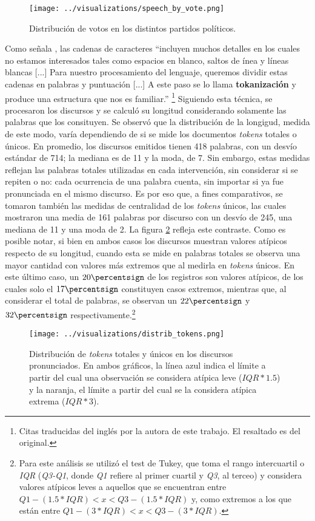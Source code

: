 \begin{figure}[h!]
    \centering
    \texttt{[image: ../visualizations/speech\_by\_vote.png]}
    \caption{Distribuci\'on de votos en los distintos partidos pol\'iticos.}%
    \label{fig-distrib-speech}
\end{figure}

Como señala \cite{bird2009natural}, las cadenas de caracteres ``incluyen muchos detalles
en los cuales no estamos interesados tales como espacios en blanco, saltos de \'inea
y l\'ineas blancas [...] Para nuestro procesamiento del lenguaje, queremos dividir
estas cadenas en palabras y puntuaci\'on  [...] A este paso se lo llama
\textbf{tokanizaci\'on} y produce una estructura que nos es familiar.''
\footnote{Citas traducidas del ingl\'es por la autora de este trabajo.
El resaltado es del original.}
Siguiendo esta t\'ecnica, se procesaron los discursos y se calcul\'o su
longitud considerando solamente las palabras que los consituyen.
Se observ\'o que la distribuci\'on de la longigud, medida de este modo, var\'ia
dependiendo de si se mide los documentos \textit{tokens} totales o \'unicos.
En promedio, los discursos emitidos tienen 418 palabras, con un desv\'io
est\'andar de 714; la mediana es de 11 y la moda, de 7. Sin embargo, estas medidas
reflejan las palabras totales utilizadas en cada intervenci\'on, sin considerar si se repiten
o no: cada ocurrencia de una palabra cuenta, sin importar si ya fue pronunciada en el mismo
discurso. Es por eso que, a fines comparativos, se tomaron tambi\'en las medidas de centralidad
de los \textit{tokens} \'unicos, las cuales mostraron una media de 161 palabras por discurso
con un desv\'io de 245, una mediana de 11 y una moda de 2. La figura \ref{fig-distrib-tokens}
refleja este contraste. Como es posible notar, si bien en ambos casos los discursos
muestran valores at\'ipicos respecto de su longitud, cuando esta se mide en palabras
totales se observa una mayor cantidad con valores m\'as extremos que
al medirla en \textit{tokens} \'unicos. En este \'ultimo caso, un
$20\percentsign$ de los registros son valores at\'ipicos, de los cuales solo el
$17\percentsign$ constituyen casos extremos, mientras que, al considerar
el total de palabras, se observan un $22\percentsign$ y $32\percentsign$
respectivamente.\footnote{Para este an\'alisis se utiliz\'o el
test de Tukey, que toma el rango intercuartil o \textit{IQR} (\textit{Q3-Q1}, donde
\textit{Q1} refiere al primer cuartil y \textit{Q3}, al terceo) y considera
valores at\'ipicos leves a aquellos que se encuentran entre
$Q1 - (1.5 * IQR) < x < Q3 - (1.5 * IQR)$ y, como extremos a los que est\'an entre
$Q1 - (3 * IQR) < x < Q3 - (3 * IQR)$.}

\begin{figure}[h!]%
    \centering%
    \texttt{[image: ../visualizations/distrib\_tokens.png]}%
    \caption{Distribuci\'on de \textit{tokens} totales y \'unicos en los discursos pronunciados. En ambos gr\'aficos,
    la l\'inea azul indica el l\'imite a partir del cual una observaci\'on se considera at\'ipica leve
    ($IQR*1.5$) y la naranja, el l\'imite a partir del cual se la considera at\'ipica extrema ($IQR*3$).}%
    \label{fig-distrib-tokens}%
\end{figure}%
